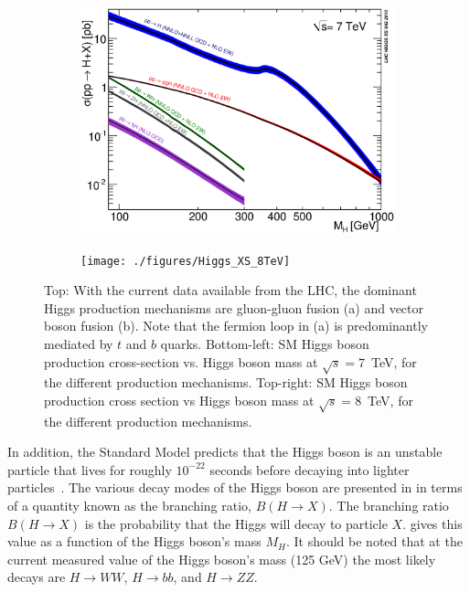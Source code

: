 \begin{figure}[htbp]
    \begin{subfigure}[b]{0.45\textwidth}
        \centering
        \includegraphics[scale=0.35, angle=0]{./figures/Higgs_XS_7TeV}
        \caption{}
        \label{fig:XS7TeV}
    \end{subfigure}
    \quad 
    \begin{subfigure}[b]{0.45\textwidth}
        \centering
        \texttt{[image: ./figures/Higgs\_XS\_8TeV]}
        \caption{}
        \label{fig:XS8TeV}
    \end{subfigure}

    \caption{Top: With the current data available from the LHC, the dominant Higgs
    production mechanisms are gluon-gluon fusion (a) and vector boson fusion (b).
    Note that the fermion loop in (a) is predominantly mediated by
    $t$ and $b$ quarks.
    Bottom-left: SM Higgs boson production cross-section vs. Higgs boson mass
    at $\sqrt{s}=7$~TeV, for the different production mechanisms.
    Top-right: SM Higgs boson production cross section vs Higgs
    boson mass at $\sqrt{s}=8$~TeV, for the different production
    mechanisms.}
    \label{fig:ggVBF}
\end{figure}


In addition, the Standard Model predicts that the Higgs boson is an unstable particle
that lives for roughly $10^{-22}$ seconds before decaying into lighter particles~\cite{LHCHiggsCrossSectionWorkingGroup:2012vm}. 
The various decay modes of the Higgs boson are presented in 
in terms of a quantity known as the branching ratio, $B(H \to X)$. The branching
ratio $B(H \to X)$ is the probability that the Higgs will decay to particle $X$.
 gives this value as a function of the Higgs boson's mass $M_{H}$.
It should be noted that at the current measured value of the Higgs boson's mass (125 GeV)
the most likely decays are $H \to WW$, $H \to bb$, and $H \to ZZ$.

